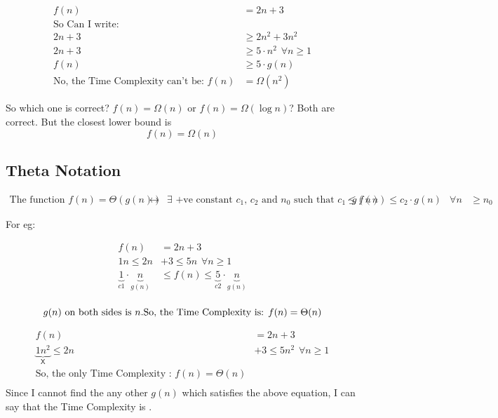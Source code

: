 \documentclass{article}
\begin{document}
\[
\begin{aligned}
    f(n) &= 2n + 3 \\
    \text{So Can I write: }\\
        2n+3 &\geq 2n^2 + 3n^2\\ 
        2n+3 &\geq 5\cdot n^2 \hspace{5pt} \forall n \geq 1 \\
        f(n) &\geq 5 \cdot g(n) \\
        \text{No, the Time Complexity can't be: } f(n) &= \Omega(n^2)
\end{aligned}
\]

So which one is correct? $f(n) = \Omega(n)$ or $f(n) = \Omega(\log{n})$? Both are correct. But the closest lower bound is 
\[
\boxed{f(n) = \Omega(n)}
\]

\subsection{Theta Notation}
\[
\begin{aligned}
        \text{The function } f(n) = \Theta{(g(n))} &\leftrightarrow &\exists \text{ +ve constant $c_1$, $c_2$ and } 
        n_0 \text{ such that } c_1 \cdot g{(n)} &\leq f{(n)} \leq c_2 \cdot g{(n)} &\forall n &\geq n_0
\end{aligned}
\]

For eg:

\[
\begin{aligned}
        f(n) &= 2n + 3 \\
        1n \leq 2n &+ 3 \leq 5n  \hspace{5pt} \forall  n \geq 1 \\
        \underbrace{1}_{c1} \cdot \underbrace{n}_{g(n)} &\leq f(n) \leq \underbrace{5}_{c2} \cdot \underbrace{n}_{g(n)}\\    
\end{aligned}
\]

\[
g(n)\text{ on both sides is }n. \\
\text{So, the Time Complexity is: } \\
f(n) = \Theta(n)\\
\]


\[
\begin{aligned}
        f(n) &= 2n + 3 \\
    \underbrace{1n^2}_{\mathsf{X}}  \leq 2n &+ 3 \leq 5n^2  \hspace{5pt} \forall  n \geq 1 \\
        \text{So, the only Time Complexity : } \boxed{f(n) = \Theta(n)}\\
\end{aligned}
\]
Since I cannot find the any other $g(n)$ which satisfies the above equation, I can say that the Time Complexity is .
\end{document}
